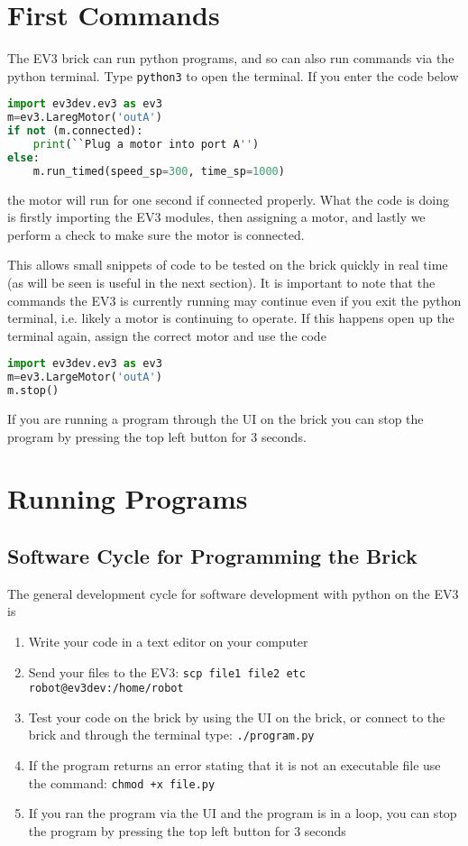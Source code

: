 \documentclass{article}
\begin{document}
\section{First Commands}
The EV3 brick can run python programs, and so can also run commands via the python terminal. Type \texttt{python3} to open the terminal. If you enter the code below 

\begin{lstlisting}[language=Python]
import ev3dev.ev3 as ev3
m=ev3.LaregMotor('outA')
if not (m.connected):
    print(``Plug a motor into port A'')
else:
    m.run_timed(speed_sp=300, time_sp=1000)
\end{lstlisting}

the motor will run for one second if connected properly. What the code is doing is firstly importing the EV3 modules, then assigning a motor, and lastly we perform a check to make sure the motor is connected.

This allows small snippets of code to be tested on the brick quickly in real time (as will be seen is useful in the next section). It is important to note that the commands the EV3 is currently running may continue even if you exit the python terminal, i.e. likely a motor is continuing to operate. If this happens open up the terminal again, assign the correct motor and use the code

\begin{lstlisting}[language=python]
import ev3dev.ev3 as ev3
m=ev3.LargeMotor('outA')
m.stop()
\end{lstlisting}

If you are running a program through the UI on the brick you can stop the program by pressing the top left button for 3 seconds.  

\section{Running Programs}
\subsection{Software Cycle for Programming the Brick}
The general development cycle for software development with python on the EV3 is

\begin{enumerate}
    \item Write your code in a text editor on your computer
    \item Send your files to the EV3: \texttt{scp file1 file2 etc robot@ev3dev:/home/robot}
    \item Test your code on the brick by using the UI on the brick, or connect to the brick and through the terminal type: \texttt{./program.py}
    \item If the program returns an error stating that it is not an executable file use the command: \texttt{chmod +x file.py}
    \item If you ran the program via the UI and the program is in a loop, you can stop the program by pressing the top left button for 3 seconds
\end{enumerate}
\end{document}
